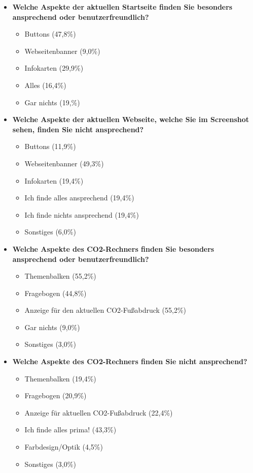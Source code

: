 \begin{itemize}
    \item \textbf{Welche Aspekte der aktuellen Startseite finden Sie besonders ansprechend oder benutzerfreundlich?}
          \begin{itemize}
              \item Buttons (47,8\%)
              \item Webseitenbanner (9,0\%)
              \item Infokarten (29,9\%)
              \item Alles (16,4\%)
              \item Gar nichts (19,\%)
          \end{itemize}
    \item \textbf{Welche Aspekte der aktuellen Webseite, welche Sie im Screenshot sehen, finden Sie nicht ansprechend?}
          \begin{itemize}
              \item Buttons (11,9\%)
              \item Webseitenbanner (49,3\%)
              \item Infokarten (19,4\%)
              \item Ich finde alles ansprechend (19,4\%)
              \item Ich finde nichts ansprechend (19,4\%)
              \item Sonstiges (6,0\%)
          \end{itemize}
    \item \textbf{Welche Aspekte des CO2-Rechners finden Sie besonders ansprechend oder benutzerfreundlich?}
          \begin{itemize}
              \item Themenbalken (55,2\%)
              \item Fragebogen (44,8\%)
              \item Anzeige für den aktuellen CO2-Fußabdruck (55,2\%)
              \item Gar nichts (9,0\%)
              \item Sonstiges (3,0\%)
          \end{itemize}
    \item \textbf{Welche Aspekte des CO2-Rechners finden Sie nicht ansprechend?}
          \begin{itemize}
              \item Themenbalken (19,4\%)
              \item Fragebogen (20,9\%)
              \item Anzeige für aktuellen CO2-Fußabdruck (22,4\%)
              \item Ich finde alles prima! (43,3\%)
              \item Farbdesign/Optik (4,5\%)
              \item Sonstiges (3,0\%)
          \end{itemize}
\end{itemize}

